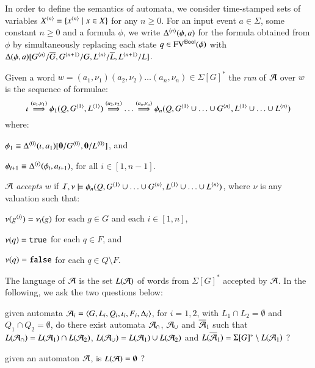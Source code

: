 \documentclass{llncs}
\begin{document}
In order to define the semantics of automata, we consider time-stamped
sets of variables ${X}^{\left\langle n \right\rangle} = \{{x}^{\left\langle n \right\rangle} \mid x \in X\}$ for
any $n\geq0$. For an input event $a \in \Sigma$, some constant
$n\geq0$ and a formula $\phi$, we write ${\Delta}^{\left\langle n \right\rangle}(\phi,a)$
for the formula obtained from $\phi$ by simultaneously replacing each
state $q \in \mathrm{FV}^{\mathsf{Bool}}(\phi)$ with
$\Delta(\phi,a)[{G}^{\left\langle n \right\rangle}/\overline{G}, {G}^{\left\langle n+1 \right\rangle}/G,
  {L}^{\left\langle n \right\rangle}/\overline{L}, {L}^{\left\langle n+1 \right\rangle}/L]$.

Given a word $w = (a_1,\nu_1)(a_2,\nu_2) \ldots (a_n,\nu_n) \in
\Sigma[G]^*$ the \emph{run} of $\mathcal{A}$ over $w$ is the sequence of
formulae: \[\iota \stackrel{(a_1,\nu_1)}{\Longrightarrow}
\phi_1(Q,{G}^{\left\langle 1 \right\rangle},
{L}^{\left\langle 1 \right\rangle}) \stackrel{(a_2,\nu_2)}{\Longrightarrow} \ldots
\stackrel{(a_n,\nu_n)}{\Longrightarrow} \phi_n(Q,{G}^{\left\langle 1 \right\rangle} \cup
\ldots \cup {G}^{\left\langle n \right\rangle}, {L}^{\left\langle 1 \right\rangle} \cup \ldots \cup
{L}^{\left\langle n \right\rangle})\] where: \begin{compactitem}
\item $\phi_1 \equiv {\Delta}^{\left\langle 0 \right\rangle}(\iota,a_1)[\mathbf{0}/{G}^{\left\langle 0 \right\rangle},\mathbf{0}/{L}^{\left\langle 0 \right\rangle}]$, and
%
\item $\phi_{i+1} \equiv {\Delta}^{\left\langle i \right\rangle}(\phi_i,a_{i+1})$, for all $i \in [1,n-1]$.
\end{compactitem}
$\mathcal{A}$ \emph{accepts} $w$ if $\mathcal{I},\nu \models \phi_n(Q,{G}^{\left\langle 1 \right\rangle} \cup
\ldots \cup {G}^{\left\langle n \right\rangle}, {L}^{\left\langle 1 \right\rangle} \cup \ldots \cup
{L}^{\left\langle n \right\rangle})$, where $\nu$ is any valuation such
that: \begin{compactitem}
\item $\nu({g}^{\left\langle i \right\rangle}) = \nu_i(g)$ for each $g \in G$ and each $i \in [1,n]$, 
%
\item $\nu(q) = \mathtt{true}$ for each $q \in F$, and
%
\item $\nu(q) = \mathtt{false}$ for each $q \in Q \setminus F$.
\end{compactitem}
The language of $\mathcal{A}$ is the set $L(\mathcal{A})$ of words from $\Sigma[G]^*$
accepted by $\mathcal{A}$. In the following, we ask the two
questions below: \begin{compactenum}
\item given automata $\mathcal{A}_i = \left\langle G,L_i,Q_i,\iota_i,F_i,\Delta_i \right\rangle$,
  for $i=1,2$, with $L_1 \cap L_2 = \emptyset$ and $Q_1 \cap Q_2 =
  \emptyset$, do there exist automata $\mathcal{A}_\cap$, $\mathcal{A}_\cup$ and
  $\overline{\mathcal{A}}_1$ such that $L(\mathcal{A}_\cap) = L(\mathcal{A}_1) \cap L(\mathcal{A}_2)$,
  $L(\mathcal{A}_\cup) = L(\mathcal{A}_1) \cup L(\mathcal{A}_2)$ and $L(\overline{\mathcal{A}}_1) =
  \Sigma[G]^* \setminus L(\mathcal{A}_1)$ ?
%
\item given an automaton $\mathcal{A}$, is $L(\mathcal{A}) = \emptyset$ ? 
\end{compactenum}

\end{document}
